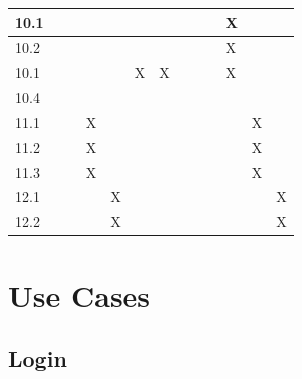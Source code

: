 \documentclass[12pt]{article}
\begin{document}
\begin{longtable}{ |p{1cm}|p{0.8cm}|p{0.8cm}|p{1.2cm}|p{0.8cm}|p{0.8cm}|p{0.8cm}|p{0.8cm}|p{0.8cm}|p{0.8cm}|p{1.2cm}|p{0.8cm}|p{0.8cm}|  }
 \hline

 10.1&  &   &   &   &   &   &   &   &   &  X &   &\\

 \hline

 10.2&  &   &   &   &   &   &   &   &   & X  &   &\\

 \hline

 10.1&  &   &   &   &  X & X  &   &   &   &  X &   &\\

 \hline

 10.4&  &   &   &   &   &   &   &   &   &   &   &\\

 \hline

 11.1&  &   &X   &   &   &   &   &   &   &   & X  &\\

 \hline

 11.2&  &   &X   &   &   &   &   &   &   &   & X  &\\

 \hline

 11.3&  &   &X   &   &   &   &   &   &   &   & X  &\\

 \hline

 12.1&  &   &   &X   &   &   &   &   &   &   &   &X\\

 \hline

 12.2&  &   &   & X  &   &   &   &   &   &   &   &X\\

 \hline

  \end{longtable}
  
  
  \section{Use Cases}

	

	\subsection{Login}
	

\centering

\label{my-label}
\end{document}
